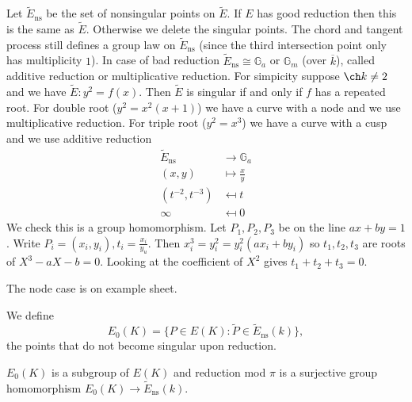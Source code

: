 \documentclass[a4paper]{article}
\theoremstyle{definition}
\begin{document}
Let \(\widetilde E_{\mathrm{ns}}\) be the set of nonsingular points on \(\widetilde E\). If \(E\) has good reduction then this is the same as \(\widetilde E\). Otherwise we delete the singular points. The chord and tangent process still defines a group law on \(\widetilde E_{\mathrm{ns}}\) (since the third intersection point only has multiplicity \(1\)). In case of bad reduction \(\widetilde E_{\mathrm{ns}} \cong \mathbb G_a\) or \(\mathbb G_m\) (over \(\overline k\)), called additive reduction or multiplicative reduction. For simpicity suppose \(\ch k \neq 2\) and we have \(\widetilde E: y^2 = f(x)\). Then \(\widetilde E\) is singular if and only if \(f\) has a repeated root. For double root (\(y^2 = x^2(x + 1)\)) we have a curve with a node and we use multiplicative reduction. For triple root (\(y^2 = x^3\)) we have a curve with a cusp and we use additive reduction
\begin{align*}
  \widetilde E_{\mathrm{ns}} &\to \mathbb G_a \\
  (x, y) &\mapsto \frac{x}{y} \\
  (t^{-2}, t^{-3}) &\mapsfrom t \\
  \infty &\mapsfrom 0
\end{align*}
We check this is a group homomorphism. Let \(P_1, P_2, P_3\) be on the line \(ax + by = 1\). Write \(P_i = (x_i, y_i), t_i = \frac{x_i}{y_u}\). Then \(x_i^3 = y_i^2 = y_i^2(ax_i + by_i)\) so \(t_1, t_2, t_3\) are roots of \(X^3 - aX - b = 0\). Looking at the coefficient of \(X^2\) gives \(t_1 + t_2 + t_3 = 0\).

The node case is on example sheet.

\begin{definition}
  We define
  \[
    E_0(K) = \{P \in E(K): \widetilde P \in \widetilde E_{\mathrm{ns}}(k)\},
  \]
  the points that do not become singular upon reduction.
\end{definition}

\begin{proposition}
  \(E_0(K)\) is a subgroup of \(E(K)\) and reduction mod \(\pi\) is a surjective group homomorphism \(E_0(K) \to \widetilde E_{\mathrm{ns}}(k)\).
\end{proposition}
\end{document}
